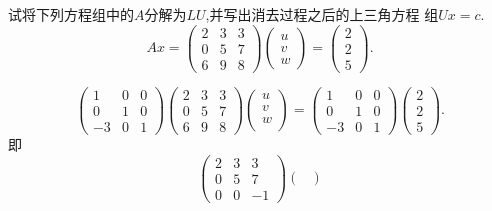 ﻿\documentclass{book} \usepackage{exsheets} \usepackage{xeCJK}
\begin{document}
\begin{question}
  试将下列方程组中的$A$分解为$LU$,并写出消去过程之后的上三角方程
  组$Ux=c$.
$$
Ax=
\begin{pmatrix}
  2&3&3\\
  0&5&7\\
  6&9&8
\end{pmatrix}
\begin{pmatrix}
  u\\
  v\\
  w
\end{pmatrix}=
\begin{pmatrix}
  2\\
  2\\
  5
\end{pmatrix}.
$$
\end{question}
\begin{solution}
  \begin{equation}\label{eq:1.4.3.1}\tag{1}
    \begin{pmatrix}
      1&0&0\\
      0&1&0\\
      -3&0&1
    \end{pmatrix}
    \begin{pmatrix}
      2&3&3\\
      0&5&7\\
      6&9&8
    \end{pmatrix}
    \begin{pmatrix}
      u\\
      v\\
      w\\
    \end{pmatrix}=\begin{pmatrix}
      1&0&0\\
      0&1&0\\
      -3&0&1
    \end{pmatrix}
    \begin{pmatrix}
      2\\
      2\\
      5
    \end{pmatrix}.
  \end{equation}
  即
  \begin{equation}\label{eq:1.4.3.2}\tag{2}
    \begin{pmatrix}
      2&3&3\\
      0&5&7\\
      0&0&-1
    \end{pmatrix}
    \begin{pmatrix}

\end{pmatrix}
\end{equation}
\end{solution}
\end{document}
